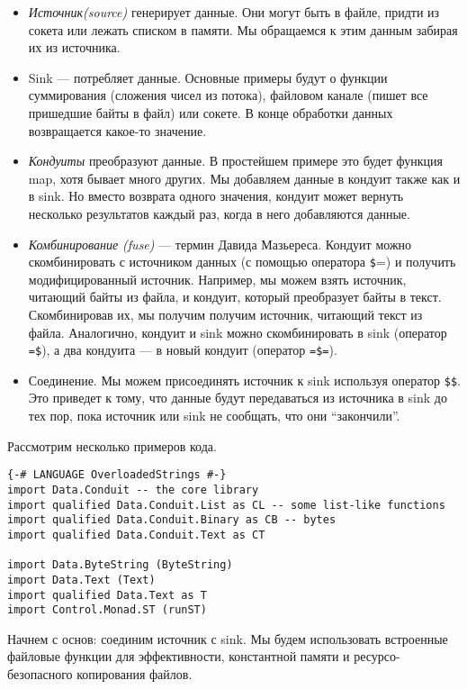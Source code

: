 \begin{itemize}
 \item \textit{Источник(source)} генерирует данные. Они могут быть в файле, придти из
сокета или лежать списком в памяти. Мы обращаемся к этим данным забирая их из источника.
 \item Sink --- потребляет данные. Основные примеры будут о функции суммирования
(сложения чисел из потока), файловом канале (пишет все пришедшие байты в файл) или
сокете. В конце обработки данных возвращается какое-то значение.
 \item \textit{Кондуиты} преобразуют данные. В простейшем примере это будет функция map,
хотя бывает много других. Мы добавляем данные в кондуит также как и в sink. Но вместо
возврата одного значения, кондуит может вернуть несколько результатов каждый раз, когда в
него добавляются данные.
  \item \textit{Комбинирование (fuse)} --- термин Давида Мазьереса. Кондуит можно 
скомбинировать с источником данных (с помощью оператора \verb=$==) и получить
модифицированный источник. Например, мы можем взять источник, читающий байты из файла, и
кондуит, который преобразует байты в текст. Скомбинировав их, мы получим получим
источник, читающий текст из файла. Аналогично, кондуит и sink можно скомбинировать в sink
(оператор \verb#=$#), а два кондуита --- в новый кондуит (оператор \verb#=$=#).
  \item Соединение. Мы можем присоединять источник к sink используя оператор \verb=$$=.
Это приведет к тому, что данные будут передаваться из источника в sink до тех пор, пока
источник или sink не сообщать, что они ``закончили''.
\end{itemize}

Рассмотрим несколько примеров кода.
\begin{lstlisting}
{-# LANGUAGE OverloadedStrings #-}
import Data.Conduit -- the core library
import qualified Data.Conduit.List as CL -- some list-like functions
import qualified Data.Conduit.Binary as CB -- bytes
import qualified Data.Conduit.Text as CT

import Data.ByteString (ByteString)
import Data.Text (Text)
import qualified Data.Text as T
import Control.Monad.ST (runST)
\end{lstlisting}
Начнем с основ: соединим источник с sink. Мы будем использовать встроенные файловые
функции для эффективности, константной памяти и ресурсо-безопасного копирования файлов.

